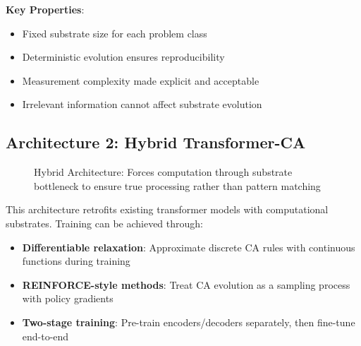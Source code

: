 \documentclass[11pt,letterpaper]{article}
\theoremstyle{plain}
\theoremstyle{definition}
\theoremstyle{remark}
\begin{document}
\textbf{Key Properties}:
\begin{itemize}
\item Fixed substrate size for each problem class
\item Deterministic evolution ensures reproducibility
\item Measurement complexity made explicit and acceptable
\item Irrelevant information cannot affect substrate evolution
\end{itemize}

\subsection{Architecture 2: Hybrid Transformer-CA}

\begin{figure}[h]
\centering
{}
\caption{Hybrid Architecture: Forces computation through substrate bottleneck to ensure true processing rather than pattern matching}
\label{fig:hybrid-architecture}
\end{figure}

This architecture retrofits existing transformer models with computational substrates. Training can be achieved through:
\begin{itemize}
\item \textbf{Differentiable relaxation}: Approximate discrete CA rules with continuous functions during training
\item \textbf{REINFORCE-style methods}: Treat CA evolution as a sampling process with policy gradients
\item \textbf{Two-stage training}: Pre-train encoders/decoders separately, then fine-tune end-to-end
\end{itemize}
\end{document}

